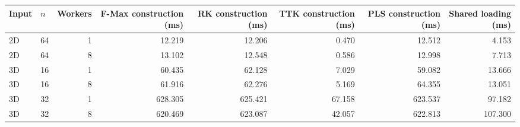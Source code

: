 \begin{tabular}{llrrrrrr}
\hline
Input & $n$ & Workers & F-Max construction (ms) & RK construction (ms) & TTK construction (ms) & PLS construction (ms) & Shared loading (ms) \\
\hline
2D & 64 & 1 & 12.219 & 12.206 & 0.470 & 12.512 & 4.153 \\
2D & 64 & 8 & 13.102 & 12.548 & 0.586 & 12.998 & 7.713 \\
3D & 16 & 1 & 60.435 & 62.128 & 7.029 & 59.082 & 13.666 \\
3D & 16 & 8 & 61.916 & 62.276 & 5.169 & 64.355 & 13.051 \\
3D & 32 & 1 & 628.305 & 625.421 & 67.158 & 623.537 & 97.182 \\
3D & 32 & 8 & 620.469 & 623.087 & 42.057 & 622.813 & 107.300 \\
\hline
\end{tabular}
